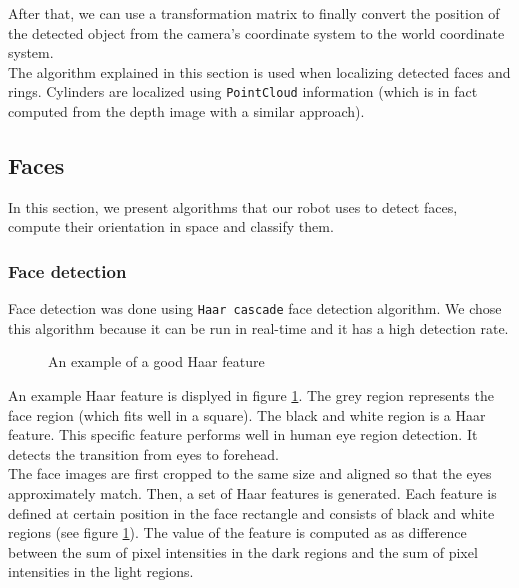 \documentclass[12pt,a4paper]{article}
\begin{document}
	After that, we can use a transformation matrix to finally convert the position of the detected object from the camera's coordinate system to the world coordinate system. \\ 
	
	The algorithm explained in this section is used when localizing detected faces and rings. Cylinders are localized using \texttt{PointCloud} information (which is in fact computed from the depth image with a similar approach). \\
	
	\subsection{Faces}
	In this section, we present algorithms that our robot uses to detect faces, compute their orientation in space and classify them.
	
	\subsubsection{Face detection} \label{face_detection_algorithm}
	
	Face detection was done using \texttt{Haar cascade} face detection algorithm. We chose this algorithm because it can be run in real-time and it has a high detection rate. \\
	
	\begin{figure}[h]
		\centering
		\caption{An example of a good Haar feature}
		\label{fig:haar_features}
	\end{figure}

	An example Haar feature is displyed in figure \ref{fig:haar_features}. The grey region represents the face region (which fits well in a square). The black and white region is a Haar feature. This specific feature performs well in human eye region detection. It detects the transition from eyes to forehead. \\
	
	The face images are first cropped to the same size and aligned so that the eyes approximately match. Then, a set of Haar features is generated. Each feature is defined at certain position in the face rectangle and consists of black and white regions (see figure \ref{fig:haar_features}). The value of the feature is computed as as difference between the sum of pixel intensities in the dark regions and the sum of pixel intensities in the light regions. \\
	
\end{document}
